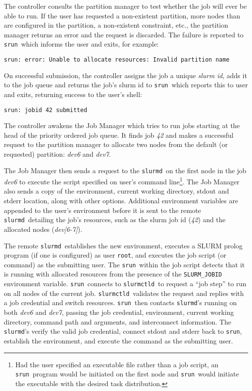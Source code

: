 \documentclass{article}
\newcommand{\srun}{{\tt srun}}
\newcommand{\slurmctld}{{\tt slurmctld}}
\newcommand{\slurmd}{{\tt slurmd}}
\begin{document}
The controller consults the partition manager to test whether the job 
will ever be able to run.  If the user has requested a non-existent partition,
more nodes than are configured in the partition, a non-existent constraint, 
etc., the partition manager returns an error and the request is discarded.
The failure is reported to \srun\ which informs the user and exits, for example:
\begin{verbatim}
srun: error: Unable to allocate resources: Invalid partition name
\end{verbatim}

On successful submission, the controller assigns the job a unique 
{\em slurm id}, adds it to the job queue and returns the job's
slurm id to \srun\, which reports this to user and exits, returning
success to the user's shell:

\begin{verbatim}
srun: jobid 42 submitted
\end{verbatim}

The controller awakens the Job Manager which tries to run
jobs starting at the head of the priority ordered job queue.  
It finds job {\em 42}
and makes a successful request to the partition manager to allocate 
two nodes from the default (or requested) partition: {\em dev6} and 
{\em dev7}.

The Job Manager then sends a request to the \slurmd\ on the first node 
in the job {\em dev6} to execute the script specified on user's
command line\footnote{Had the user specified an executable file rather 
than a job script, an \srun\ program would be initiated on the first 
node and \srun\ would initiate the executable with the desired task distribution.}.
The Job Manager also sends a 
copy of the environment, current working directory, stdout and stderr location,
along with other options. Additional environment variables are appended
to the user's environment before it is sent to the remote \slurmd\ detailing
the job's resources, such as the slurm job id ({\em 42}) and the
allocated nodes ({\em dev[6-7]}).

The remote \slurmd\ establishes the new environment, executes a SLURM 
prolog program (if one is configured) as user {\tt root}, and executes the
job script (or command) as the submitting user. The \srun\ within the job script 
detects that it is running with allocated resources from the presence
of the {\tt SLURM\_JOBID} environment variable. \srun\ connects to
\slurmctld\ to request a ``job step'' to run on all nodes of the current
job. \slurmctld\ validates the request and replies with a job credential
and switch resources. \srun\ then contacts \slurmd 's running on both
{\em dev6} and {\em dev7}, passing the job credential, environment,
current working directory, command path and arguments, and interconnect
information. The {\tt slurmd}'s verify the valid job credential, connect
stdout and stderr back to \srun , establish the environment, and execute
the command as the submitting user.
\end{document}
